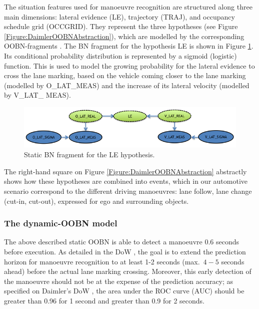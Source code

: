 The situation features used for manoeuvre recognition are structured along three main dimensions: lateral evidence (LE), trajectory (TRAJ), and occupancy schedule grid (OCCGRID). They represent the three hypotheses (see Figure \ref{Figure:DaimlerOOBNAbstraction}), which are modelled by the corresponding OOBN-fragments \cite{kasper2012object}. The BN fragment for the hypothesis LE is shown in Figure \ref{Figure:DaimlerLE}. Its conditional probability distribution is represented by a sigmoid (logistic) function. This is used to model the growing probability for the lateral evidence to cross the lane marking, based on the vehicle coming closer to the lane marking (modelled by O\_LAT\_MEAS) and the increase of its lateral velocity (modelled by V\_LAT\_ MEAS).

\begin{figure}
\begin{center}
\includegraphics[scale=0.58]{./figures/DaimlerLE}
\caption{\label{Figure:DaimlerLE} Static BN fragment for the LE hypothesis.}
\end{center}
\end{figure}

The right-hand square on Figure \ref{Figure:DaimlerOOBNAbstraction} abstractly shows how these hypotheses are combined into events, which in our automotive scenario correspond to the different driving manoeuvres: lane follow, lane change (cut-in, cut-out), expressed for ego and surrounding objects\cite{kasper2012object}.

\subsubsection{The dynamic-OOBN model}

The above described static OOBN is able to detect a manoeuvre $0.6$ seconds before execution. As detailed in the DoW \cite{Fer14}, the goal is to extend the prediction horizon for manoeuvre recognition to at least 1-2 seconds (max.\ $4-5$ seconds ahead) before the actual lane marking crossing. Moreover, this early detection of the manoeuvre should not be at the expense of the prediction accuracy;  as specified on Daimler's DoW \cite{Fer14}, the area under the ROC curve (AUC) should be greater than 0.96 for 1 second and greater than 0.9 for 2 seconds.

